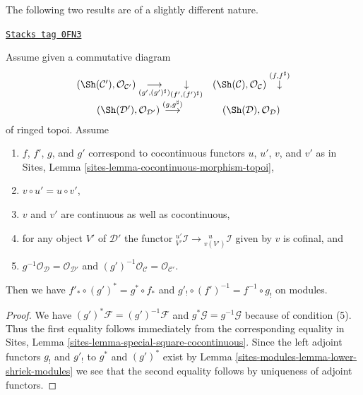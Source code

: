 The following two results are of a slightly different nature.

\begin{lemma}
\label{sites-modules-lemma-special-square-cocontinuous}
\href{https://stacks.math.columbia.edu/tag/0FN3}{\texttt{Stacks tag 0FN3}}

Assume given a commutative diagram
$$
\begin{array}{cc}(\Sh(\mathcal{C}'), \mathcal{O}_{\mathcal{C}'})
\underset{(g', (g')^\sharp)}{\longrightarrow}\underset{(f', (f')^\sharp)}{\downarrow} & (\Sh(\mathcal{C}), \mathcal{O}_\mathcal{C}) \overset{(f, f^\sharp)}{\downarrow} \\ (\Sh(\mathcal{D}'), \mathcal{O}_{\mathcal{D}'}) \overset{(g, g^\sharp)}{\longrightarrow} & (\Sh(\mathcal{D}), \mathcal{O}_\mathcal{D})\end{array}
$$
of ringed topoi. Assume
\begin{enumerate}
\item $f$, $f'$, $g$, and $g'$ correspond to cocontinuous functors
$u$, $u'$, $v$, and $v'$ as in
Sites, Lemma \ref{sites-lemma-cocontinuous-morphism-topoi},
\item $v \circ u' = u \circ v'$,
\item $v$ and $v'$ are continuous as well as cocontinuous,
\item for any object $V'$ of $\mathcal{D}'$ the functor
${}^{u'}_{V'}\mathcal{I} \to {}^{\ \ \ u}_{v(V')}\mathcal{I}$
given by $v$ is cofinal, and
\item $g^{-1}\mathcal{O}_{\mathcal{D}} = \mathcal{O}_{\mathcal{D}'}$
and $(g')^{-1}\mathcal{O}_{\mathcal{C}} = \mathcal{O}_{\mathcal{C}'}$.
\end{enumerate}
Then we have $f'_* \circ (g')^* = g^* \circ f_*$ and
$g'_! \circ (f')^{-1} = f^{-1} \circ g_!$ on modules.
\end{lemma}

\begin{proof}
We have $(g')^*\mathcal{F} = (g')^{-1}\mathcal{F}$ and
$g^*\mathcal{G} = g^{-1}\mathcal{G}$ because of condition (5).
Thus the first equality follows immediately from the corresponding
equality in Sites, Lemma \ref{sites-lemma-special-square-cocontinuous}.
Since the left adjoint functors $g_!$ and $g'_!$ to $g^*$ and $(g')^*$
exist by Lemma \ref{sites-modules-lemma-lower-shriek-modules}
we see that the second equality follows by
uniqueness of adjoint functors.
\end{proof}

